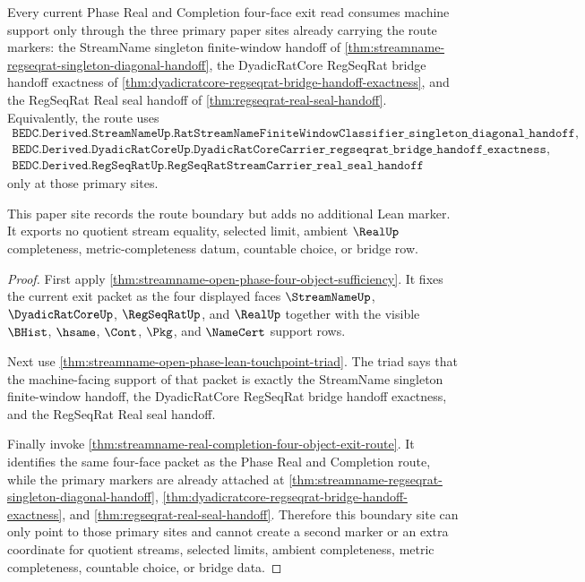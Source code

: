 \begin{theorem}
\label{thm:streamname-real-completion-exit-lean-route-boundary}
Every current Phase Real and Completion four-face exit read consumes machine support only through the three primary paper sites already carrying the route markers: the StreamName singleton finite-window handoff of \autoref{thm:streamname-regseqrat-singleton-diagonal-handoff}, the DyadicRatCore RegSeqRat bridge handoff exactness of \autoref{thm:dyadicratcore-regseqrat-bridge-handoff-exactness}, and the RegSeqRat Real seal handoff of \autoref{thm:regseqrat-real-seal-handoff}. Equivalently, the route uses
$$
\begin{gathered}
\texttt{BEDC.Derived.StreamNameUp.RatStreamNameFiniteWindowClassifier\_singleton\_diagonal\_handoff},\\
\texttt{BEDC.Derived.DyadicRatCoreUp.DyadicRatCoreCarrier\_regseqrat\_bridge\_handoff\_exactness},\\
\texttt{BEDC.Derived.RegSeqRatUp.RegSeqRatStreamCarrier\_real\_seal\_handoff}
\end{gathered}
$$
only at those primary sites.

This paper site records the route boundary but adds no additional Lean marker. It exports no quotient stream equality, selected limit, ambient $\RealUp$ completeness, metric-completeness datum, countable choice, or bridge row.
\end{theorem}
\begin{proof}
First apply \autoref{thm:streamname-open-phase-four-object-sufficiency}. It fixes the current exit packet as the four displayed faces $\StreamNameUp$, $\DyadicRatCoreUp$, $\RegSeqRatUp$, and $\RealUp$ together with the visible $\BHist$, $\hsame$, $\Cont$, $\Pkg$, and $\NameCert$ support rows.

Next use \autoref{thm:streamname-open-phase-lean-touchpoint-triad}. The triad says that the machine-facing support of that packet is exactly the StreamName singleton finite-window handoff, the DyadicRatCore RegSeqRat bridge handoff exactness, and the RegSeqRat Real seal handoff.

Finally invoke \autoref{thm:streamname-real-completion-four-object-exit-route}. It identifies the same four-face packet as the Phase Real and Completion route, while the primary markers are already attached at \autoref{thm:streamname-regseqrat-singleton-diagonal-handoff}, \autoref{thm:dyadicratcore-regseqrat-bridge-handoff-exactness}, and \autoref{thm:regseqrat-real-seal-handoff}. Therefore this boundary site can only point to those primary sites and cannot create a second marker or an extra coordinate for quotient streams, selected limits, ambient completeness, metric completeness, countable choice, or bridge data.
\end{proof}

